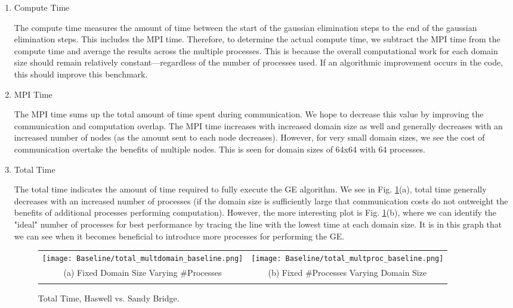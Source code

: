 \begin{enumerate}
\begin{enumerate}
	\item Compute Time
	
	The compute time measures the amount of time between the start of the gaussian elimination steps to the end of the gaussian elimination steps. This includes the MPI time. Therefore, to determine the actual compute time, we subtract the MPI time from the compute time and average the results across the multiple processes. This is because the overall computational work for each domain size should remain relatively constant---regardless of the number of processes used. If an algorithmic improvement occurs in the code, this should improve this benchmark.
	
	\item MPI Time
	
	The MPI time sums up the total amount of time spent during communication. We hope to decrease this value by improving the communication and computation overlap. The MPI time increases with increased domain size as well and generally decreases with an increased number of nodes (as the amount sent to each node decreases). However, for very small domain sizes, we see the cost of communication overtake the benefits of multiple nodes. This is seen for domain sizes of 64x64 with 64 processes.
	
	\item Total Time
	
	The total time indicates the amount of time required to fully execute the GE algorithm. We see in Fig. \ref{fig:total}(a), total time generally decreases with an increased number of processes (if the domain size is sufficiently large that communication costs do not outweight the benefits of additional processes performing computation). However, the more interesting plot is Fig. \ref{fig:total}(b), where we can identify the "ideal" number of processes for best performance by tracing the line with the lowest time at each domain size. It is in this graph that we can see when it becomes beneficial to introduce more processes for performing the GE.
 	
 	
 	\begin{figure}[h] %
		\begin{tabular}{cc}
			\hspace*{-0.35\linewidth}\texttt{[image: Baseline/total\_multdomain\_baseline.png]} & \hspace*{-0.05\linewidth}\texttt{[image: Baseline/total\_multproc\_baseline.png]} \\
		    \hspace*{-0.45\linewidth}(a) Fixed Domain Size Varying \#Processes & \hspace*{-0.15\linewidth}(b) Fixed \#Processes Varying Domain Size\\[6pt]\\
		\end{tabular}
		\caption{Total Time, Haswell vs. Sandy Bridge.}
		\label{fig:total}
	\end{figure}
	\end{enumerate}


\end{enumerate}
